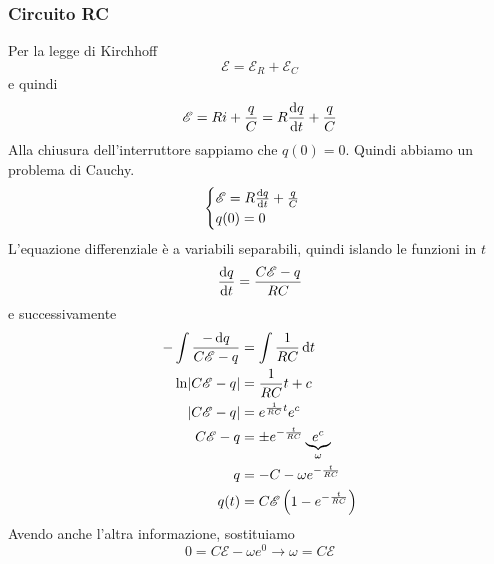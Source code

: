 \subsubsection{Circuito RC}
\begin{center}
\end{center}
Per la legge di Kirchhoff
\begin{equation*}
  \mathcal{E} = \mathcal{E}_R + \mathcal{E}_C
\end{equation*}
e quindi
\begin{equation*}
  \mathcal{E} = Ri + \frac{q}{C}=R\frac{\mathop{}\!\mathrm{d} q}{\mathop{}\!\mathrm{d} t}+\frac{q}{C}
\end{equation*}
Alla chiusura dell'interruttore sappiamo che $q(0)=0$. Quindi abbiamo un problema di Cauchy.
\begin{equation*}
  \begin{cases}
    \mathcal{E} = R\frac{\mathop{}\!\mathrm{d} q}{\mathop{}\!\mathrm{d} t}+\frac{q}{C}\\
    q(0) = 0
  \end{cases}
\end{equation*}
L'equazione differenziale è a variabili separabili, quindi islando le funzioni in $t$
\begin{equation*}
  \frac{\mathop{}\!\mathrm{d} q}{\mathop{}\!\mathrm{d} t}=\frac{C\mathcal{E}-q}{RC}
\end{equation*}
e successivamente
\begin{align*}
  -\int\frac{-\mathop{}\!\mathrm{d} q}{C\mathcal{E}-q}&=\int\frac{1}{RC}\mathop{}\!\mathrm{d} t\\
  \ln\lvert C\mathcal{E}-q\rvert&=\frac{1}{RC}t+c\\
  \lvert C\mathcal{E}-q\rvert &= e^{\frac{1}{RC}t}e^c\\
  C\mathcal{E}-q&=\pm e^{-\frac{t}{RC}}\underbrace{e^c}_{\omega}\\
  q&=-C-\omega e^{-\frac{t}{RC}}\\
  q(t) &= C\mathcal{E}\left(1-e^{-\frac{t}{RC}}\right)
\end{align*}
Avendo anche l'altra informazione, sostituiamo
\begin{equation*}
  0=C\mathcal{E}-\omega e^0 \rightarrow \omega = C\mathcal{E}
\end{equation*}

